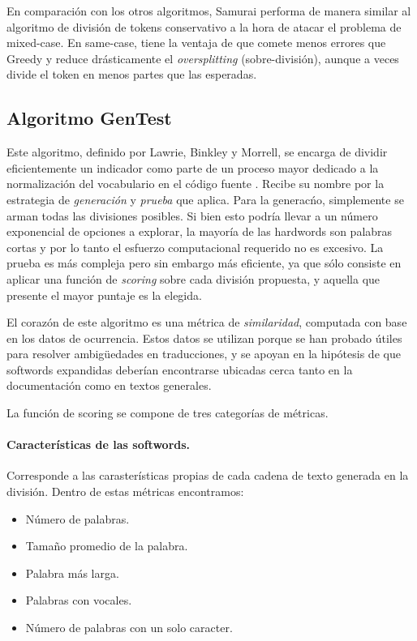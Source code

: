 En comparación con los otros algoritmos, Samurai performa de manera similar al algoritmo de división de tokens conservativo a la hora de atacar el problema de mixed-case.
En same-case, tiene la ventaja de que comete menos errores que Greedy y reduce drásticamente el \textit{oversplitting} (sobre-división), aunque a veces divide el token en menos partes que las esperadas.

\subsection{Algoritmo GenTest}
Este algoritmo, definido por Lawrie, Binkley y Morrell, se encarga de dividir eficientemente un indicador como parte de un proceso mayor dedicado a la normalización del vocabulario en el código fuente \cite{LawrieBinkleyMorrell2010}.
Recibe su nombre por la estrategia de \textit{generación} y \textit{prueba} que aplica.
Para la generacńo, simplemente se arman todas las divisiones posibles.
Si bien esto podría llevar a un número exponencial de opciones a explorar, la mayoría de las hardwords son palabras cortas y por lo tanto el esfuerzo computacional requerido no es excesivo.
La prueba es más compleja pero sin embargo más eficiente, ya que sólo consiste en aplicar una función de \textit{scoring} sobre cada división propuesta, y aquella que presente el mayor puntaje es la elegida.

El corazón de este algoritmo es una métrica de \textit{similaridad}, computada con base en los datos de ocurrencia.
Estos datos se utilizan porque se han probado útiles para resolver ambigüedades en traducciones, y se apoyan en la hipótesis de que softwords expandidas deberían encontrarse ubicadas cerca tanto en la documentación como en textos generales.

La función de scoring se compone de tres categorías de métricas.
\paragraph{Características de las softwords.}
Corresponde a las carasterísticas propias de cada cadena de texto generada en la división.
Dentro de estas métricas encontramos:
\begin{itemize}
  \item Número de palabras.
  \item Tamaño promedio de la palabra.
  \item Palabra más larga.
  \item Palabras con vocales.
  \item Número de palabras con un solo caracter.
\end{itemize}

